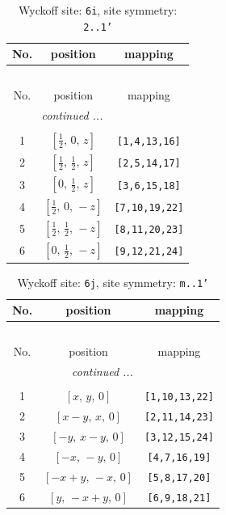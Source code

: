 \documentclass[fleqn,8pt]{jsarticle}
\begin{document}
\renewcommand{\arraystretch}{1.2}
\begin{longtable}{ccc}
\caption{Wyckoff site: {\tt 6i}, site symmetry: {\tt 2..1'}}
 \\
 \hline \hline
No. & position & mapping \\ \hline \endfirsthead

\multicolumn{2}{l}{\tablename\ \thetable{}} \\
 \hline \hline
No. & position & mapping \\ \hline \endhead

 \hline \hline
\multicolumn{2}{r}{\footnotesize\it continued ...} \\ \endfoot

 \hline \hline
\multicolumn{2}{r}{} \\ \endlastfoot

1 & $\left[ \frac{1}{2},\, 0,\, z \right]$ & {\tt [1,4,13,16]} \\ \hline
2 & $\left[ \frac{1}{2},\, \frac{1}{2},\, z \right]$ & {\tt [2,5,14,17]} \\ \hline
3 & $\left[ 0,\, \frac{1}{2},\, z \right]$ & {\tt [3,6,15,18]} \\ \hline
4 & $\left[ \frac{1}{2},\, 0,\, - z \right]$ & {\tt [7,10,19,22]} \\ \hline
5 & $\left[ \frac{1}{2},\, \frac{1}{2},\, - z \right]$ & {\tt [8,11,20,23]} \\ \hline
6 & $\left[ 0,\, \frac{1}{2},\, - z \right]$ & {\tt [9,12,21,24]} \\
\end{longtable}
\renewcommand{\arraystretch}{1.2}
\begin{longtable}{ccc}
\caption{Wyckoff site: {\tt 6j}, site symmetry: {\tt m..1'}}
 \\
 \hline \hline
No. & position & mapping \\ \hline \endfirsthead

\multicolumn{2}{l}{\tablename\ \thetable{}} \\
 \hline \hline
No. & position & mapping \\ \hline \endhead

 \hline \hline
\multicolumn{2}{r}{\footnotesize\it continued ...} \\ \endfoot

 \hline \hline
\multicolumn{2}{r}{} \\ \endlastfoot

1 & $\left[ x,\, y,\, 0 \right]$ & {\tt [1,10,13,22]} \\ \hline
2 & $\left[ x - y,\, x,\, 0 \right]$ & {\tt [2,11,14,23]} \\ \hline
3 & $\left[ - y,\, x - y,\, 0 \right]$ & {\tt [3,12,15,24]} \\ \hline
4 & $\left[ - x,\, - y,\, 0 \right]$ & {\tt [4,7,16,19]} \\ \hline
5 & $\left[ - x + y,\, - x,\, 0 \right]$ & {\tt [5,8,17,20]} \\ \hline
6 & $\left[ y,\, - x + y,\, 0 \right]$ & {\tt [6,9,18,21]} \\
\end{longtable}
\end{document}
